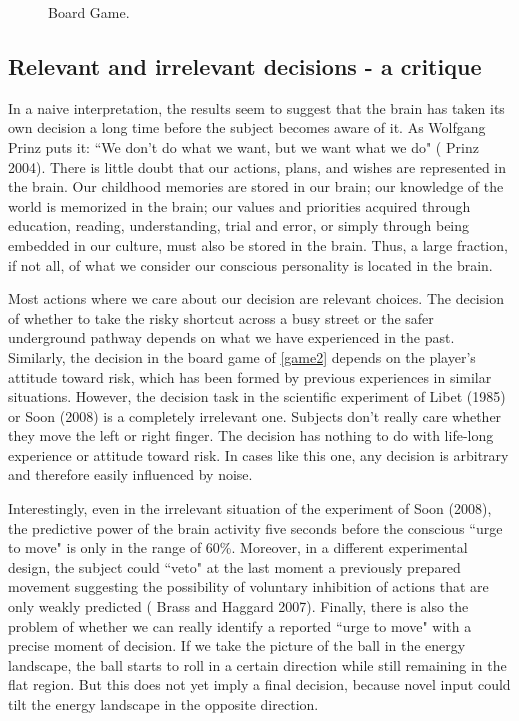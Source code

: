 \documentclass[12pt,hyperref,a4paper,UTF8]{ctexart}
\begin{document}
\begin{figure}[h]
\begin{minipage}{0.3\textwidth}
        \caption{Board Game.}
        \label{game2}  
    \end{minipage}  
\end{figure} 

\subsection{Relevant and irrelevant decisions - a critique}

In a naive interpretation, the results seem to suggest that the brain has taken its own decision a long time before the subject becomes aware of it. As Wolfgang Prinz puts it: ``We don't do what we want, but we want what we do" (\cite{Prinz 2004} Prinz 2004). There is little doubt that our actions, plans, and wishes are represented in the brain. Our childhood memories are stored in our brain; our knowledge of the world is memorized in the brain; our values and priorities acquired through education, reading, understanding, trial and error, or simply through being embedded in our culture, must also be stored in the brain. Thus, a large fraction, if not all, of what we consider our conscious personality is located in the brain.

Most actions where we care about our decision are relevant choices. The decision of whether to take the risky shortcut across a busy street or the safer underground pathway depends on what we have experienced in the past. Similarly, the decision in the board game of \autoref{game2} depends on the player's attitude toward risk, which has been formed by previous experiences in similar situations. However, the decision task in the scientific experiment of Libet (1985) or Soon (2008) is a completely irrelevant one. Subjects don't really care whether they move the left or right finger. The decision has nothing to do with life-long experience or attitude toward risk. In cases like this one, any decision is arbitrary and therefore easily influenced by noise. 

Interestingly, even in the irrelevant situation of the experiment of Soon (2008), the predictive power of the brain activity five seconds before the conscious ``urge to move" is only in the range of 60\%. Moreover, in a different experimental design, the subject could ``veto" at the last moment a previously prepared movement suggesting the possibility of voluntary inhibition of actions that are only weakly predicted (\cite{Brass and Haggard 2007} Brass and Haggard 2007). Finally, there is also the problem of whether we can really identify a reported ``urge to move" with a precise moment of decision. If we take the picture of the ball in the energy landscape, the ball starts to roll in a certain direction while still remaining in the flat region. But this does not yet imply a final decision, because novel input could tilt the energy landscape in the opposite direction.
\end{document}
